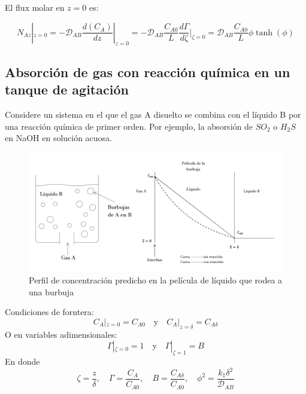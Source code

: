 El flux molar en $z=0$ es:

\begin{equation}
    N_{Az}|_{z=0}=-\mathscr{D}_{AB}\frac{d(C_A)}{dz}|_{z=0}=-\mathscr{D}_{AB}\frac{C_{A0}}{L}\frac{d\Gamma}{d\zeta}|_{\zeta=0}=\mathscr{D}_{AB}\frac{C_{A0}}{L}\phi\tanh(\phi)
\end{equation}



\subsection{Absorción de gas con reacción química en un tanque de agitación}
Considere un sistema en el que el gas A disuelto se combina con el líquido B por una reacción química de primer orden. Por ejemplo, la absorsión de $SO_2$ o $H_2S$ en NaOH en solución acuosa.

\begin{figure}[H]
    \centering
    \includegraphics[width=\linewidth]{Capitulo2/Imagenes/Fig_2.10.png}
    \caption{Perfil de concentración predicho en la película de líquido que rodea a una burbuja}
    \label{fig:fig_2.10}
\end{figure}

Condiciones de forntera:
\begin{equation}
    C_A|_{z=0}=C_{A0} \quad\text{y}\quad
    C_A|_{z=\delta}=C_{A\delta}
\end{equation}
O en variables adimensionales:
\begin{equation}
    \Gamma|_{\zeta=0}=1 \quad \text{y} \quad
    \Gamma|_{\zeta=1}=B
        \label{eq_2.66}
\end{equation}
En donde 
\begin{equation*}
    \zeta = \frac{z}{\delta}, \quad \Gamma = \frac{C_A}{C_{A0}}, \quad B = \frac{C_{A\delta}}{C_{A0}}, \quad \phi^2 = \frac{k_1 \delta^2}{\mathscr{D}_{AB}}
\end{equation*}


